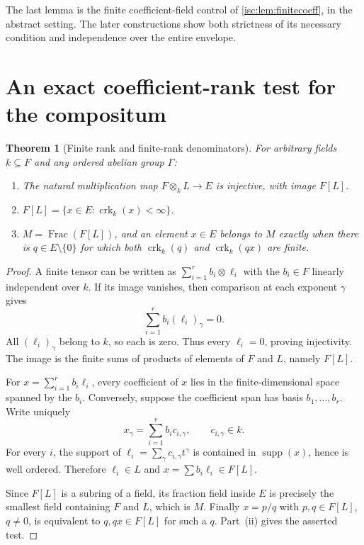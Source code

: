 \documentclass[11pt,letterpaper]{article}
\newtheorem{theorem}{Theorem}[section]
\theoremstyle{definition}
\newtheorem{definition}[theorem]{Definition}
\theoremstyle{remark}
\newcommand{\supp}{\operatorname{supp}}
\newcommand{\Frac}{\operatorname{Frac}}
\newcommand{\crk}{\operatorname{crk}}%
\numberwithin{equation}{section}
\begin{document}
The last lemma is the finite coefficient-field control of
\cref{isc:lem:finitecoeff}, in the abstract setting. The later constructions
show both strictness of its necessary condition and independence over the
entire envelope.

\section{An exact coefficient-rank test for the compositum}
\label{isc:cp:sec:rank}


\begin{theorem}[Finite rank and finite-rank denominators]\label{isc:cp:thm:rank}
For arbitrary fields $k\subseteq F$ and any ordered abelian group $\Gamma$:
\begin{enumerate}[label=\textup{(\roman*)}]
\item The natural multiplication map $F\otimes_k L\to E$ is injective, with
image $F[L]$.
\item $F[L]=\{x\in E:\crk_k(x)<\infty\}$.
\item $M=\Frac(F[L])$, and an element $x\in E$ belongs to $M$ exactly when
there is $q\in E\setminus\{0\}$ for which both $\crk_k(q)$ and
$\crk_k(qx)$ are finite.
\end{enumerate}
\end{theorem}
\begin{proof}
A finite tensor can be written as $\sum_{i=1}^r b_i\otimes\ell_i$ with the
$b_i\in F$ linearly independent over $k$. If its image vanishes, then
comparison at each exponent $\gamma$ gives
\[
 \sum_{i=1}^r b_i(\ell_i)_\gamma=0.
\]
All $(\ell_i)_\gamma$ belong to $k$, so each is zero. Thus every $\ell_i=0$,
proving injectivity. The image is the finite sums of products of elements of
$F$ and $L$, namely $F[L]$.

For $x=\sum_{i=1}^r b_i\ell_i$, every coefficient of $x$ lies in the
finite-dimensional space spanned by the $b_i$. Conversely, suppose the
coefficient span has basis $b_1,\ldots,b_r$. Write uniquely
\[
 x_\gamma=\sum_{i=1}^r b_i c_{i,\gamma},\qquad c_{i,\gamma}\in k.
\]
For every $i$, the support of $\ell_i=\sum_\gamma c_{i,\gamma}t^\gamma$ is
contained in $\supp(x)$, hence is well ordered. Therefore $\ell_i\in L$ and
$x=\sum b_i\ell_i\in F[L]$.

Since $F[L]$ is a subring of a field, its fraction field inside $E$ is
precisely the smallest field containing $F$ and $L$, which is $M$. Finally
$x=p/q$ with $p,q\in F[L]$, $q\ne0$, is equivalent to $q,qx\in F[L]$ for
such a $q$. Part~(ii) gives the asserted test.
\end{proof}
\end{document}
